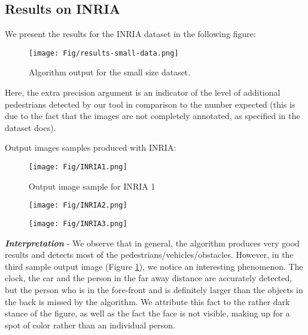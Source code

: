 \documentclass[runningheads,a4paper,11pt]{report}
\begin{document}
\subsection{Results on INRIA}

We present the results for the INRIA dataset in the following figure:

\begin{figure}[htbp]
	\centerline{\texttt{[image: Fig/results-small-data.png]}} 
	\caption{Algorithm output for the small size dataset.}
\end{figure}

Here, the extra precision argument is an indicator of the level of additional pedestrians detected by our tool in comparison to the number expected  (this is due to the fact that the images are not completely annotated, as specified in the dataset docs).

Output images samples produced with INRIA:


\begin{figure}[htbp]
	\centerline{\texttt{[image: Fig/INRIA1.png]}} 
	\caption{Output image sample for INRIA 1}
\end{figure}
\begin{figure}
\centering
\begin{minipage}{.5\textwidth}
  \centering
  \texttt{[image: Fig/INRIA2.png]}
  \label{fig:inria2}
\end{minipage}%
\begin{minipage}{.5\textwidth}
  \centering
  \texttt{[image: Fig/INRIA3.png]}
  \label{fig:inria3}
\end{minipage}
\end{figure}

\textbf{\emph{Interpretation}} - We observe that in general, the algorithm produces very good results and detects most of the pedestrians/vehicles/obstacles. However, in the third sample output image (Figure \ref{fig:inria3}), we notice an interesting phenomenon. The clock, the car and the person in the far away distance are accurately detected, but the person who is in the fore-front and is definitely larger than the objects in the back is missed by the algorithm. We attribute this fact to the rather dark stance of the figure, as well as the fact the face is not visible, making up for a spot of color rather than an individual person.
\end{document}
